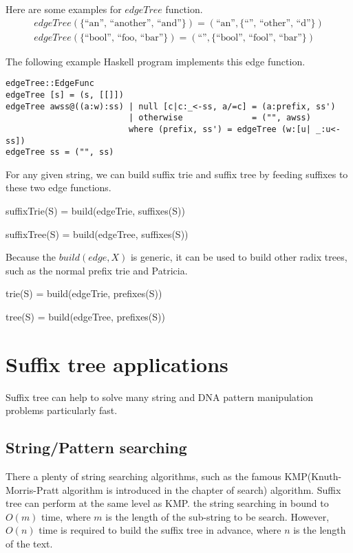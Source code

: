\documentclass[UTF8]{article}
\begin{document}
Here are some examples for $edgeTree$ function.
\[
\begin{array}{l}
edgeTree(\{ \text{``an'', ``another'', ``and''}\}) = (\text{``an''}, \{\text{``'', ``other'', ``d''}\}) \\
edgeTree(\{ \text{``bool'', ``foo, ``bar''}\}) = (\text{``''}, \{\text{``bool'', ``fool'', ``bar''}\})
\end{array}
\]

The following example Haskell program implements this edge function.

\begin{lstlisting}
edgeTree::EdgeFunc
edgeTree [s] = (s, [[]])
edgeTree awss@((a:w):ss) | null [c|c:_<-ss, a/=c] = (a:prefix, ss')
                         | otherwise              = ("", awss)
                         where (prefix, ss') = edgeTree (w:[u| _:u<-ss])
edgeTree ss = ("", ss)
\end{lstlisting}

For any given string, we can build suffix trie and suffix tree by feeding suffixes to these
two edge functions.

\be
suffixTrie(S) = build(edgeTrie, suffixes(S))
\ee

\be
suffixTree(S) = build(edgeTree, suffixes(S))
\ee

Because the $build(edge, X)$ is generic, it can be used to build other radix trees, such
as the normal prefix trie and Patricia.

\be
trie(S) = build(edgeTrie, prefixes(S))
\ee

\be
tree(S) = build(edgeTree, prefixes(S))
\ee


\section{Suffix tree applications}

Suffix tree can help to solve many string and DNA pattern manipulation problems
particularly fast.

\subsection{String/Pattern searching}
\label{substring-lookup}

There a plenty of string searching algorithms, such as the
famous KMP(Knuth-Morris-Pratt algorithm is introduced in the chapter of search)
algorithm. Suffix tree can perform at the same level as
KMP\cite{zhang-shaojie-lec}. the string searching in bound to $O(m)$ time,
where $m$ is the length of the sub-string to be search. However, $O(n)$ time is
required to build the suffix tree in advance, where $n$ is the length
of the text\cite{lallison-stree}.
\end{document}
